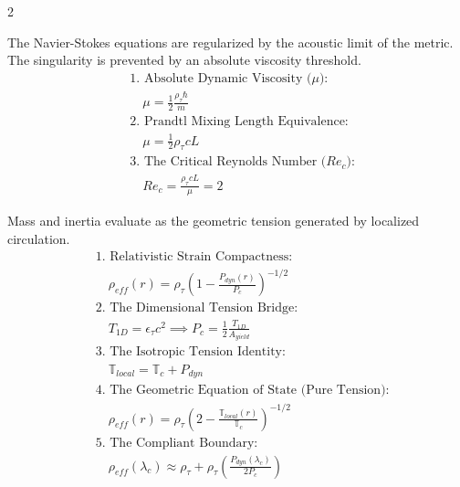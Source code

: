 \documentclass[11pt, a4paper]{article}
\newcounter{cheatnum}
\begin{document}
\begin{multicols}{2}
\begin{tcolorbox}[cheatbox, title={\refstepcounter{cheatnum}\label{box:ns_reg}\thecheatnum. Navier-Stokes Regularization (Topological Pinch-Off) \scriptsize\hfill\hyperref[sec:deriv_ns_reg]{[Proof $\downarrow$]}}]
The Navier-Stokes equations are regularized by the acoustic limit of the metric. The singularity is prevented by an absolute viscosity threshold.
\begin{align}
    &\text{1. Absolute Dynamic Viscosity ($\mu$):} \nonumber \\
    &\quad \mu = \frac{1}{2} \frac{\rho_{\tau} \hbar}{m} \label{eq:vacuum_viscosity} \\
    &\text{2. Prandtl Mixing Length Equivalence:} \nonumber \\
    &\quad \mu = \frac{1}{2} \rho_{\tau} c L \label{eq:prandtl_equivalence} \\
    &\text{3. The Critical Reynolds Number ($Re_c$):} \nonumber \\
    &\quad Re_c = \frac{\rho_{\tau} c L}{\mu} = 2 \label{eq:critical_reynolds}
\end{align}
\end{tcolorbox}

\begin{tcolorbox}[cheatbox, title={\refstepcounter{cheatnum}\label{box:fluid_inertia}\thecheatnum. Origin of Inertia (Strain Compactness \& Tension) \scriptsize\hfill\hyperref[sec:deriv_fluid_inertia]{[Proof $\downarrow$]}}]
Mass and inertia evaluate as the geometric tension generated by localized circulation.
\begin{align}
    &\text{1. Relativistic Strain Compactness:} \nonumber \\
    &\quad \rho_{eff}(r) = \rho_{\tau} \left( 1 - \frac{P_{dyn}(r)}{P_c} \right)^{-1/2} \label{eq:fluid_inertia_gradient} \\
    &\text{2. The Dimensional Tension Bridge:} \nonumber \\
    &\quad T_{1D} = \epsilon_{\tau} c^2 \implies P_c = \frac{1}{2} \frac{T_{1D}}{A_{yield}} \label{eq:dimensional_tension_bridge} \\
    &\text{3. The Isotropic Tension Identity:} \nonumber \\
    &\quad \mathbb{T}_{local} = \mathbb{T}_c + P_{dyn} \label{eq:tension_identity} \\
    &\text{4. The Geometric Equation of State (Pure Tension):} \nonumber \\
    &\quad \rho_{eff}(r) = \rho_{\tau} \left( 2 - \frac{\mathbb{T}_{local}(r)}{\mathbb{T}_c} \right)^{-1/2} \label{eq:tension_density} \\
    &\text{5. The Compliant Boundary:} \nonumber \\
    &\quad \rho_{eff}(\lambda_c) \approx \rho_{\tau} + \rho_{\tau} \left( \frac{P_{dyn}(\lambda_c)}{2P_c} \right) \label{eq:compliant_inertia}
\end{align}
\end{tcolorbox}


\end{multicols}
\end{document}
